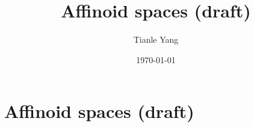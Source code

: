 \documentclass{noteformyself}
\title{Affinoid spaces (draft)}
\author{Tianle Yang}
\date{\today}
\begin{document}
    \maketitle

    \section{Affinoid spaces (draft)}



\end{document}
